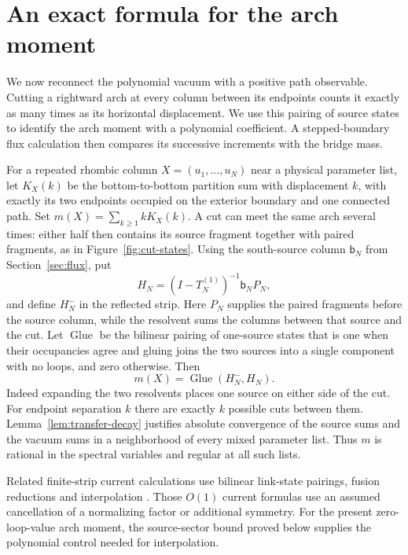 \section{An exact formula for the arch moment}\label{sec:arch}

We now reconnect the polynomial vacuum with a positive path observable.
Cutting a rightward arch at every column between its endpoints counts
it exactly as many times as its horizontal displacement. We use this
pairing of source states to identify the arch moment with a polynomial
coefficient. A stepped-boundary flux calculation then compares its
successive increments with the bridge mass.


For a repeated rhombic column $X=(u_1,\ldots,u_N)$ near a physical
parameter list, let $K_X(k)$ be the bottom-to-bottom partition sum
with displacement $k$, with exactly its two endpoints occupied on
the exterior boundary and one connected path. Set
$m(X)=\sum_{k\ge1}kK_X(k)$. A cut can meet the same arch several
times: either half then contains its source fragment together with
paired fragments, as in Figure~\ref{fig:cut-states}. Using the
south-source column $\mathsf b_N$ from Section~\ref{sec:flux}, put
\begin{equation}\label{eq:01-integrated-source}
 H_N=(I-T_N^{(1)})^{-1}\mathsf b_NP_N,
\end{equation}
and define $H_N^-$ in the reflected strip. Here $P_N$ supplies the
paired fragments before the source column, while the resolvent sums
the columns between that source and the cut. Let $\operatorname{Glue}$
be the bilinear pairing of one-source states that is one when their
occupancies agree and gluing joins the two sources into a single
component with no loops, and zero otherwise. Then
\begin{equation}\label{eq:01-moment-gluing}
 m(X)=\operatorname{Glue}(H_N^-,H_N).
\end{equation}
Indeed expanding the two resolvents places one source on either
side of the cut. For endpoint separation $k$ there are exactly $k$
possible cuts between them. Lemma~\ref{lem:transfer-decay} justifies absolute
convergence of the source sums and the vacuum sums in a neighborhood
of every mixed parameter list. Thus $m$ is rational in the spectral
variables and regular at all such lists.

Related finite-strip current calculations use bilinear link-state
pairings, fusion reductions and interpolation
\cite{DeGierNienhuisPonsaing2010,FeherNienhuis2018}. Those $O(1)$
current formulas use an assumed cancellation of a normalizing factor or additional
symmetry. For the present zero-loop-value arch moment, the source-sector
bound proved below supplies the polynomial control needed for
interpolation.

